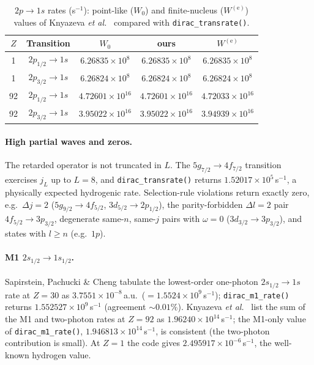\documentclass[11pt,a4paper]{article}
\begin{document}
\begin{table}[h]
\centering
\begin{tabular}{ccccc}
\hline
$Z$ & Transition & $W_{0}$ & ours & $W^{(\mathrm e)}$ \\
\hline
1  & $2p_{1/2}\to1s$ & $6.26835\times10^{8}$  & $6.26835\times10^{8}$  & $6.26835\times10^{8}$ \\
1  & $2p_{3/2}\to1s$ & $6.26824\times10^{8}$  & $6.26824\times10^{8}$  & $6.26824\times10^{8}$ \\
92 & $2p_{1/2}\to1s$ & $4.72601\times10^{16}$ & $4.72601\times10^{16}$ & $4.72033\times10^{16}$ \\
92 & $2p_{3/2}\to1s$ & $3.95022\times10^{16}$ & $3.95022\times10^{16}$ & $3.94939\times10^{16}$ \\
\hline
\end{tabular}
\caption{$2p\to1s$ rates (s${}^{-1}$): point-like ($W_{0}$) and finite-nucleus
($W^{(\mathrm e)}$) values of Knyazeva \emph{et al.}~\cite{Knyazeva2022} compared with
{\tt dirac\_transrate()}.}
\label{tab:knyazeva}
\end{table}

\paragraph{High partial waves and zeros.}
The retarded operator is not truncated in $L$.  The $5g_{7/2}\to4f_{7/2}$
transition exercises $j_{L}$ up to $L=8$, and
{\tt dirac\_transrate()} returns $1.52017\times10^{5}$\,s${}^{-1}$, a
physically expected hydrogenic rate.  Selection-rule violations return
exactly zero, e.g.\ $\Delta j=2$ ($5g_{9/2}\to4f_{5/2}$,
$3d_{5/2}\to2p_{1/2}$), the parity-forbidden $\Delta l=2$ pair
$4f_{5/2}\to3p_{3/2}$, degenerate same-$n$, same-$j$ pairs with
$\omega=0$ ($3d_{3/2}\to3p_{3/2}$), and states with $l\ge n$
(e.g.\ $1p$).

\paragraph{M1 $2s_{1/2}\to1s_{1/2}$.}
Sapirstein, Pachucki \& Cheng \cite{Sapirstein2004} tabulate the
lowest-order one-photon $2s_{1/2}\to1s$ rate at $Z=30$ as
$3.7551\times10^{-8}$\,a.u.\ ($=1.5524\times10^{9}$\,s${}^{-1}$);
{\tt dirac\_m1\_rate()} returns $1.552527\times10^{9}$\,s${}^{-1}$
(agreement $\sim0.01\%$).  Knyazeva \emph{et al.}~\cite{Knyazeva2022}
list the sum of the M1 and two-photon rates at $Z=92$ as
$1.96240\times10^{14}$\,s${}^{-1}$; the M1-only value of
{\tt dirac\_m1\_rate()}, $1.946813\times10^{14}$\,s${}^{-1}$, is
consistent (the two-photon contribution is small).  At $Z=1$ the code
gives $2.495917\times10^{-6}$\,s${}^{-1}$, the well-known hydrogen
value.
\end{document}
